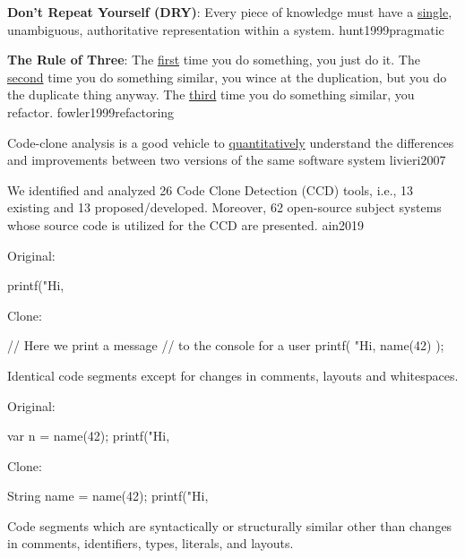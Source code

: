 \documentclass{article}
\begin{document}
  {\textbf{Don't Repeat Yourself (DRY)}: Every piece of knowledge must have a \ul{single}, unambiguous, authoritative representation within a system.}
  {hunt1999pragmatic}

  {\textbf{The Rule of Three}: The \ul{first} time you do something, you just do it. The \ul{second} time you do something similar, you wince at the duplication, but you do the duplicate thing anyway. The \ul{third} time you do something similar, you refactor.}
  {fowler1999refactoring}

  {Code-clone analysis is a good vehicle to \ul{quantitatively} understand the differences and improvements between two versions of the same software system}
  {livieri2007}

{
  {We identified and analyzed 26 Code Clone Detection (CCD) tools, i.e., 13 existing and 13 proposed/developed. Moreover, 62 open-source subject systems whose source code is utilized for the CCD are presented.}
  {ain2019}}

\begin{multicols}{2}
Original:\par
{\small\begin{ffcode}
printf("Hi, %
\end{ffcode}
}
Clone:\par
{\small\begin{ffcode}
// Here we print a message
// to the console for a user
printf(
  "Hi, %
  name(42)
);
\end{ffcode}
}
\par\columnbreak\par
Identical code segments except for changes in comments, layouts and whitespaces.
\end{multicols}
\plush{}

\begin{multicols}{2}
Original:\par
{\small\begin{ffcode}
var n = name(42);
printf("Hi, %
\end{ffcode}
}
Clone:\par
{\small\begin{ffcode}
String name = name(42);
printf("Hi, %
\end{ffcode}
}
\par\columnbreak\par
Code segments which are syntactically or structurally similar other than changes in comments, identifiers, types, literals, and layouts.
\end{multicols}
\plush{}
\end{document}
